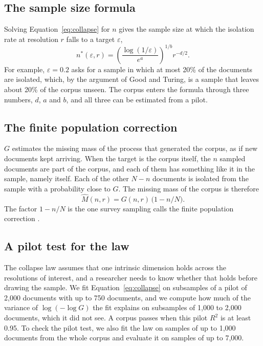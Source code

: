 \subsection{The sample size formula}

Solving Equation~\ref{eq:collapse} for $n$ gives the sample size at which the isolation rate at resolution $r$ falls to a target $\varepsilon$,
\begin{equation}
n^{*}(\varepsilon, r) = \left(\frac{\log(1/\varepsilon)}{e^{a}}\right)^{1/b} r^{-d/2} .
\label{eq:nstar}
\end{equation}
For example, $\varepsilon = 0.2$ asks for a sample in which at most 20\% of the documents are isolated, which, by the argument of Good and Turing, is a sample that leaves about 20\% of the corpus unseen. The corpus enters the formula through three numbers, $d$, $a$ and $b$, and all three can be estimated from a pilot.

\subsection{The finite population correction}

$G$ estimates the missing mass of the process that generated the corpus, as if new documents kept arriving. When the target is the corpus itself, the $n$ sampled documents are part of the corpus, and each of them has something like it in the sample, namely itself. Each of the other $N - n$ documents is isolated from the sample with a probability close to $G$. The missing mass of the corpus is therefore
\begin{equation}
\hat M(n, r) = G(n, r)\,\big(1 - n/N\big).
\label{eq:fpc}
\end{equation}
The factor $1 - n/N$ is the one survey sampling calls the finite population correction \citep{groves2009survey}.

\subsection{A pilot test for the law}

The collapse law assumes that one intrinsic dimension holds across the resolutions of interest, and a researcher needs to know whether that holds before drawing the sample. We fit Equation~\ref{eq:collapse} on subsamples of a pilot of 2{,}000 documents with up to 750 documents, and we compute how much of the variance of $\log(-\log G)$ the fit explains on subsamples of 1{,}000 to 2{,}000 documents, which it did not see. A corpus passes when this pilot $R^2$ is at least 0.95. To check the pilot test, we also fit the law on samples of up to 1{,}000 documents from the whole corpus and evaluate it on samples of up to 7{,}000.

